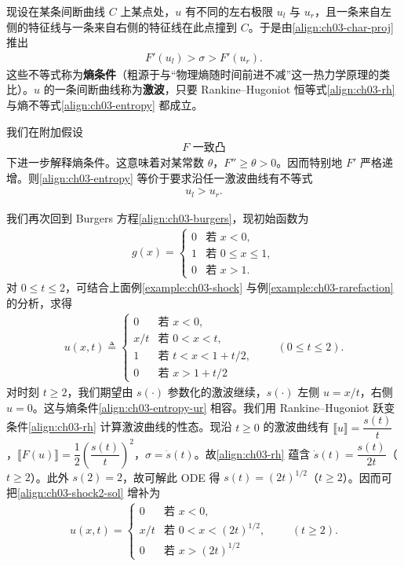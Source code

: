 \documentclass[../../main.tex]{subfiles}
\begin{document}
现设在某条间断曲线 $C$ 上某点处，$u$ 有不同的左右极限 $u_l$ 与 $u_r$，且一条来自左侧的特征线与一条来自右侧的特征线在此点撞到 $C$。于是由\eqref{align:ch03-char-proj} 推出
\begin{align}\label{align:ch03-entropy}
F'(u_l)>\sigma>F'(u_r).
\end{align}
这些不等式称为\textbf{熵条件}（粗源于与``物理熵随时间前进不减''这一热力学原理的类比）。$u$ 的一条间断曲线称为\textbf{激波}，只要 Rankine--Hugoniot 恒等式\eqref{align:ch03-rh} 与熵不等式\eqref{align:ch03-entropy} 都成立。

我们在附加假设
\begin{align}\label{align:ch03-F-unif-conv}
F\text{ 一致凸}
\end{align}
下进一步解释熵条件。这意味着对某常数 $\theta$，$F''\geqslant\theta>0$。因而特别地 $F'$ 严格递增。则\eqref{align:ch03-entropy} 等价于要求沿任一激波曲线有不等式
\begin{align}\label{align:ch03-entropy-ur}
u_l>u_r.
\end{align}

\begin{example}\label{example:ch03-shock2}
我们再次回到 Burgers 方程\eqref{align:ch03-burgers}，现初始函数为
\begin{align}\label{align:ch03-shock2-g}
g(x)=
\begin{cases}
0 & \text{若 }x<0,\\
1 & \text{若 }0\leqslant x\leqslant 1,\\
0 & \text{若 }x>1.
\end{cases}
\end{align}
对 $0\leqslant t\leqslant 2$，可结合上面例\cref{example:ch03-shock} 与例\cref{example:ch03-rarefaction} 的分析，求得
\begin{align}\label{align:ch03-shock2-sol}
u(x,t)\triangleq
\begin{cases}
0 & \text{若 }x<0,\\
x/t & \text{若 }0<x<t,\\
1 & \text{若 }t<x<1+t/2,\\
0 & \text{若 }x>1+t/2
\end{cases}
\qquad(0\leqslant t\leqslant 2).
\end{align}
对时刻 $t\geqslant 2$，我们期望由 $s(\cdot)$ 参数化的激波继续，$s(\cdot)$ 左侧 $u=x/t$，右侧 $u=0$。这与熵条件\eqref{align:ch03-entropy-ur} 相容。我们用 Rankine--Hugoniot 跃变条件\eqref{align:ch03-rh} 计算激波曲线的性态。现沿 $t\geqslant 0$ 的激波曲线有 $\llbracket u\rrbracket=\dfrac{s(t)}{t}$，$\llbracket F(u)\rrbracket=\dfrac{1}{2}\left(\dfrac{s(t)}{t}\right)^2$，$\sigma=\dot{s}(t)$。故\eqref{align:ch03-rh} 蕴含 $\dot{s}(t)=\dfrac{s(t)}{2t}$（$t\geqslant 2$）。此外 $s(2)=2$，故可解此 ODE 得 $s(t)=(2t)^{1/2}$（$t\geqslant 2$）。因而可把\eqref{align:ch03-shock2-sol} 增补为
\begin{align*}
u(x,t)=
\begin{cases}
0 & \text{若 }x<0,\\
x/t & \text{若 }0<x<(2t)^{1/2},\\
0 & \text{若 }x>(2t)^{1/2}
\end{cases}
\qquad(t\geqslant 2).
\end{align*}
\end{example}
\end{document}
